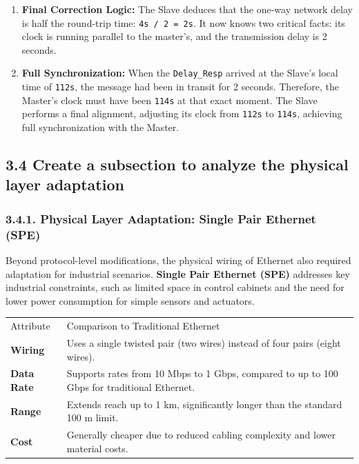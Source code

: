 \documentclass[a4paper, 12pt]{book} %
\begin{document}
\begin{enumerate}
  master's timestamped response (\texttt{112s}) is
  \texttt{112s\ -\ 108s\ =\ 4s}.
\item
  \textbf{Final Correction Logic:} The Slave deduces that the one-way
  network delay is half the round-trip time: \texttt{4s\ /\ 2\ =\ 2s}.
  It now knows two critical facts: its clock is running parallel to the
  master's, and the transmission delay is 2 seconds.
\item
  \textbf{Full Synchronization:} When the \texttt{Delay\_Resp} arrived
  at the Slave's local time of \texttt{112s}, the message had been in
  transit for 2 seconds. Therefore, the Master's clock must have been
  \texttt{114s} at that exact moment. The Slave performs a final
  alignment, adjusting its clock from \texttt{112s} to \texttt{114s},
  achieving full synchronization with the Master.
\end{enumerate}

\subsection{3.4 Create a subsection to analyze the physical layer
adaptation}\label{create-a-subsection-to-analyze-the-physical-layer-adaptation}

\subsubsection{3.4.1. Physical Layer Adaptation: Single Pair Ethernet
(SPE)}\label{physical-layer-adaptation-single-pair-ethernet-spe}

Beyond protocol-level modifications, the physical wiring of Ethernet
also required adaptation for industrial scenarios. \textbf{Single Pair
Ethernet (SPE)} addresses key industrial constraints, such as limited
space in control cabinets and the need for lower power consumption for
simple sensors and actuators.

\begin{longtable}[]{@{}
  >{\raggedright\arraybackslash}p{}
  >{\raggedright\arraybackslash}p{}@{}}
\toprule\noalign{}
\endhead
\bottomrule\noalign{}
\endlastfoot
Attribute & Comparison to Traditional Ethernet \\
\textbf{Wiring} & Uses a single twisted pair (two wires) instead of four
pairs (eight wires). \\
\textbf{Data Rate} & Supports rates from 10 Mbps to 1 Gbps, compared to
up to 100 Gbps for traditional Ethernet. \\
\textbf{Range} & Extends reach up to 1 km, significantly longer than the
standard 100 m limit. \\
\textbf{Cost} & Generally cheaper due to reduced cabling complexity and
lower material costs. \\
\end{longtable}
\end{document}
